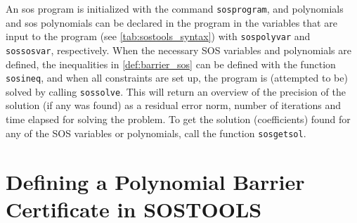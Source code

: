 \vspace{-1mm}
An \gls{sos} program is initialized with the command \texttt{sosprogram}, and polynomials and \gls{sos} polynomials can be declared in the program in the variables that are input to the program (see \autoref{tab:sostools_syntax}) with \texttt{sospolyvar} and \texttt{sossosvar}, respectively.
%
%
When the necessary SOS variables and polynomials are defined, the inequalities in \autoref{def:barrier_sos} can be defined with the function \texttt{sosineq}, and when all constraints are set up, the program is (attempted to be) solved by calling \texttt{sossolve}. This will return an overview of the precision of the solution (if any was found) as a residual error norm, number of iterations and time elapsed for solving the problem. To get the solution (coefficients) found for any of the SOS variables or polynomials, call the function \texttt{sosgetsol}.






\section{Defining a Polynomial Barrier Certificate in SOSTOOLS}\label{sec:app_sostools_barrier_search}
\vspace{-2mm}

